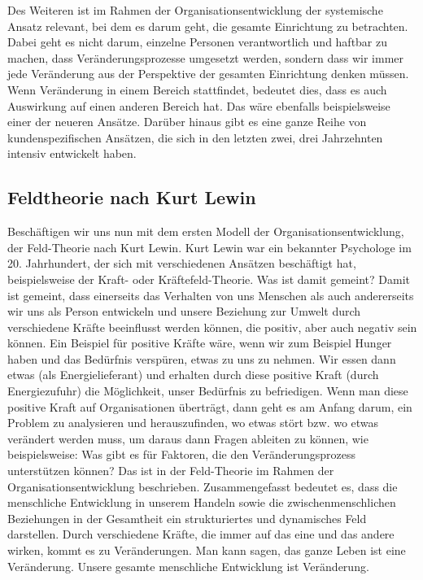 \documentclass[
  letterpaper,
]{book}
\begin{document}
Des Weiteren ist im Rahmen der Organisationsentwicklung der systemische
Ansatz relevant, bei dem es darum geht, die gesamte Einrichtung zu
betrachten. Dabei geht es nicht darum, einzelne Personen verantwortlich
und haftbar zu machen, dass Veränderungsprozesse umgesetzt werden,
sondern dass wir immer jede Veränderung aus der Perspektive der gesamten
Einrichtung denken müssen. Wenn Veränderung in einem Bereich
stattfindet, bedeutet dies, dass es auch Auswirkung auf einen anderen
Bereich hat. Das wäre ebenfalls beispielsweise einer der neueren
Ansätze. Darüber hinaus gibt es eine ganze Reihe von kundenspezifischen
Ansätzen, die sich in den letzten zwei, drei Jahrzehnten intensiv
entwickelt haben.

\subsection{Feldtheorie nach Kurt
Lewin}\label{feldtheorie-nach-kurt-lewin}

Beschäftigen wir uns nun mit dem ersten Modell der
Organisationsentwicklung, der Feld-Theorie nach Kurt Lewin. Kurt Lewin
war ein bekannter Psychologe im 20. Jahrhundert, der sich mit
verschiedenen Ansätzen beschäftigt hat, beispielsweise der Kraft- oder
Kräftefeld-Theorie. Was ist damit gemeint? Damit ist gemeint, dass
einerseits das Verhalten von uns Menschen als auch andererseits wir uns
als Person entwickeln und unsere Beziehung zur Umwelt durch verschiedene
Kräfte beeinflusst werden können, die positiv, aber auch negativ sein
können. Ein Beispiel für positive Kräfte wäre, wenn wir zum Beispiel
Hunger haben und das Bedürfnis verspüren, etwas zu uns zu nehmen. Wir
essen dann etwas (als Energielieferant) und erhalten durch diese
positive Kraft (durch Energiezufuhr) die Möglichkeit, unser Bedürfnis zu
befriedigen. Wenn man diese positive Kraft auf Organisationen überträgt,
dann geht es am Anfang darum, ein Problem zu analysieren und
herauszufinden, wo etwas stört bzw. wo etwas verändert werden muss, um
daraus dann Fragen ableiten zu können, wie beispielsweise: Was gibt es
für Faktoren, die den Veränderungsprozess unterstützen können? Das ist
in der Feld-Theorie im Rahmen der Organisationsentwicklung beschrieben.
Zusammengefasst bedeutet es, dass die menschliche Entwicklung in unserem
Handeln sowie die zwischenmenschlichen Beziehungen in der Gesamtheit ein
strukturiertes und dynamisches Feld darstellen. Durch verschiedene
Kräfte, die immer auf das eine und das andere wirken, kommt es zu
Veränderungen. Man kann sagen, das ganze Leben ist eine Veränderung.
Unsere gesamte menschliche Entwicklung ist Veränderung.
\end{document}
